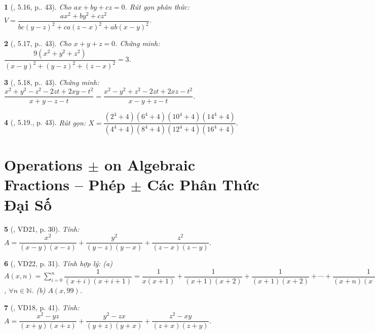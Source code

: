 \documentclass{article}
\newtheorem{baitoan}{}
\begin{document}
\begin{baitoan}[\cite{TLCT_THCS_Toan_8_dai_so}, 5.16, p.. 43]
	Cho $ax + by + cz = 0$. Rút gọn phân thức: $V = \dfrac{ax^2 + by^2 + cz^2}{bc(y - z)^2 + ca(z - x)^2 + ab(x - y)^2}$.
\end{baitoan}

\begin{baitoan}[\cite{TLCT_THCS_Toan_8_dai_so}, 5.17, p.. 43]
	Cho $x + y + z = 0$. Chứng minh: $\dfrac{9(x^2 + y^2 + z^2)}{(x - y)^2 + (y - z)^2 + (z - x)^2} = 3$.
\end{baitoan}

\begin{baitoan}[\cite{TLCT_THCS_Toan_8_dai_so}, 5.18, p.. 43]
	Chứng minh: $\dfrac{x^2 + y^2 - z^2 - 2zt + 2xy - t^2}{x + y - z - t} = \dfrac{x^2 - y^2 + z^2 - 2zt + 2xz - t^2}{x - y + z - t}$.
\end{baitoan}

\begin{baitoan}[\cite{TLCT_THCS_Toan_8_dai_so}, 5.19., p. 43]
	Rút gọn: $X = \dfrac{(2^4 + 4)(6^4 + 4)(10^4 + 4)(14^4 + 4)}{(4^4 + 4)(8^4 + 4)(12^4 + 4)(16^4 + 4)}$.
\end{baitoan}


\section{Operations $\pm$ on Algebraic Fractions -- Phép $\pm$ Các Phân Thức Đại Số}

\begin{baitoan}[\cite{Tuyen_Toan_8}, VD21, p. 30]
	Tính: $A = \dfrac{x^2}{(x - y)(x - z)} + \dfrac{y^2}{(y - z)(y - x)} + \dfrac{z^2}{(z - x)(z - y)}$.
\end{baitoan}

\begin{baitoan}[\cite{Tuyen_Toan_8}, VD22, p. 31]
	Tính hợp lý: (a) $A(x,n) = \sum_{i=0}^n \dfrac{1}{(x + i)(x + i + 1)} = \dfrac{1}{x(x + 1)} + \dfrac{1}{(x + 1)(x + 2)} + \dfrac{1}{(x + 1)(x + 2)} + \cdots + \dfrac{1}{(x + n)(x + n + 1)}$, $\forall n\in\mathbb{N}$. (b) $A(x,99)$.
\end{baitoan}

\begin{baitoan}[\cite{Tuyen_Toan_8_old}, VD18, p. 41]
	Tính: $A = \dfrac{x^2 - yz}{(x + y)(x + z)} + \dfrac{y^2 - zx}{(y + z)(y + x)} + \dfrac{z^2 - xy}{(z + x)(z + y)}$.
\end{baitoan}
\end{document}
